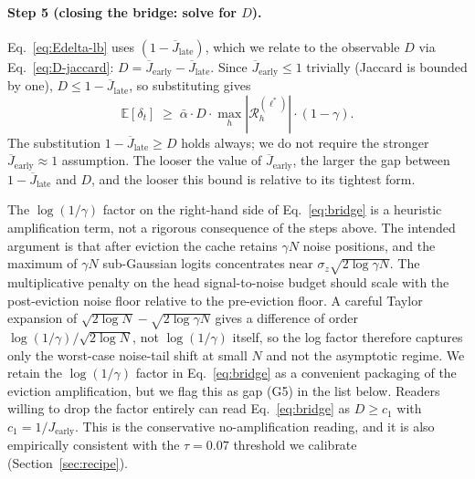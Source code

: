 \paragraph{Step 5 (closing the bridge: solve for $D$).}
Eq.~\eqref{eq:Edelta-lb} uses $(1 - \overline{J}_{\text{late}})$, which we
relate to the observable $D$ via Eq.~\eqref{eq:D-jaccard}: $D =
\overline{J}_{\text{early}} - \overline{J}_{\text{late}}$. Since
$\overline{J}_{\text{early}} \leq 1$ trivially (Jaccard is bounded by
one), $D \leq 1 - \overline{J}_{\text{late}}$, so substituting gives
\begin{equation}
\label{eq:final-lb}
\mathbb{E}[\delta_t]
\;\geq\;
\bar\alpha \cdot D \cdot \max_h |\mathcal{R}^{(\ell^*)}_h|
\cdot (1 - \gamma).
\end{equation}
The substitution $1 - \overline{J}_{\text{late}} \geq D$ holds always; we
do not require the stronger $\overline{J}_{\text{early}} \approx 1$
assumption. The looser the value of $\overline{J}_{\text{early}}$, the
larger the gap between $1 - \overline{J}_{\text{late}}$ and $D$, and the
looser this bound is relative to its tightest form.

The $\log(1/\gamma)$ factor on the right-hand side of
Eq.~\eqref{eq:bridge} is a heuristic amplification term, not a rigorous
consequence of the steps above. The intended argument is that after
eviction the cache retains $\gamma N$ noise positions, and the maximum of
$\gamma N$ sub-Gaussian logits concentrates near $\sigma_z \sqrt{2 \log
\gamma N}$. The multiplicative penalty on the head signal-to-noise budget
should scale with the post-eviction noise floor relative to the
pre-eviction floor. A careful Taylor expansion of $\sqrt{2 \log N} -
\sqrt{2 \log \gamma N}$ gives a difference of order $\log(1/\gamma) /
\sqrt{2 \log N}$, not $\log(1/\gamma)$ itself, so the log factor therefore
captures only the worst-case noise-tail shift at small $N$ and not the
asymptotic regime. We retain the $\log(1/\gamma)$ factor in
Eq.~\eqref{eq:bridge} as a convenient packaging of the eviction
amplification, but we flag this as gap (G5) in the list below. Readers
willing to drop the factor entirely can read Eq.~\eqref{eq:bridge} as $D
\geq c_1$ with $c_1 = 1/J_{\text{early}}$. This is the conservative
no-amplification reading, and it is also empirically consistent with the
$\tau = 0.07$ threshold we calibrate (Section~\ref{sec:recipe}).

